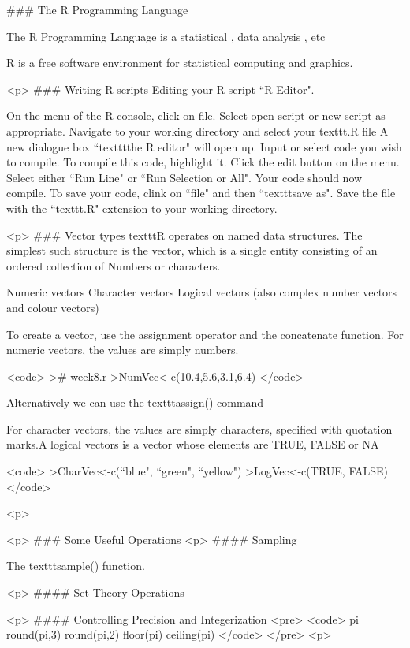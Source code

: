 
### {The R Programming Language}

The R Programming Language is a statistical , data analysis , etc

R is a free software environment for statistical computing and graphics.

<p>
### {Writing R scripts}
Editing your R script ``R Editor".

On the menu of the R console, click on file.
Select open script or new script as appropriate.
Navigate to your working directory and select your texttt{.R} file
A new dialogue box ``texttt{the R editor}" will open up.
Input or select code you wish to compile.
To compile this code, highlight it. Click the edit button on the menu.
Select either ``Run Line" or ``Run Selection or All".
Your code should now compile.
To save your code, clink on ``file" and then ``texttt{save as}".
Save the file with the ``texttt{.R}" extension to your working directory.


<p>
### {Vector types}
texttt{R} operates on named data structures. The simplest such structure is the
vector, which is a single entity consisting of an ordered collection of
Numbers or characters.


Numeric vectors
Character vectors
Logical vectors
(also complex number vectors and colour vectors)


To create a vector, use the assignment operator and the concatenate function.
For numeric vectors, the values are simply numbers.

<code>
># week8.r
>NumVec<-c(10.4,5.6,3.1,6.4)
</code>

Alternatively we can use the texttt{assign()} command

For character vectors, the values are simply characters, specified with
quotation marks.A logical vectors is a vector whose elements are TRUE, FALSE or NA

<code>
>CharVec<-c(``blue", ``green", ``yellow")
>LogVec<-c(TRUE, FALSE)
</code>

<p>






<p>
### {Some Useful Operations}
<p>
#### {Sampling}

The texttt{sample()} function.

<p>
#### {Set Theory Operations}

<p>
#### {Controlling Precision and Integerization}
<pre>
<code>
pi
round(pi,3)
round(pi,2)
floor(pi)
ceiling(pi)
</code>
</pre>
<p>

